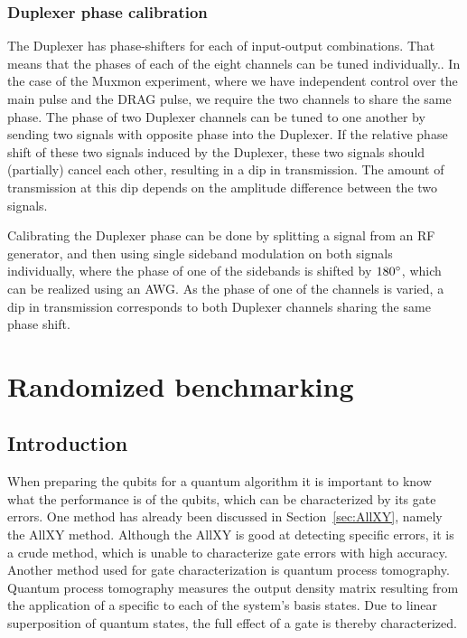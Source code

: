       \subsection{Duplexer phase calibration}
        \label{ssec:Duplexer phase calibration}
        The Duplexer has phase-shifters for each of input-output combinations. That means that the phases of each of the eight channels can be tuned individually.. In the case of the Muxmon experiment, where we have independent control over the main pulse and the DRAG pulse, we require the two channels to share the same phase. The phase of two Duplexer channels can be tuned to one another by sending two signals with opposite phase into the Duplexer. If the relative phase shift of these two signals induced by the Duplexer, these two signals should (partially) cancel each other, resulting in a dip in transmission. The amount of transmission at this dip depends on the amplitude difference between the two signals.

        Calibrating the Duplexer phase can be done by splitting a signal from an RF generator, and then using single sideband modulation on both signals individually, where the phase of one of the sidebands is shifted by $180 \degree$, which can be realized using an AWG. As the phase of one of the channels is varied, a dip in transmission corresponds to both Duplexer channels sharing the same phase shift.


  \chapter{Randomized benchmarking}
    \label{ch:randomized benchmarking}

    \section{Introduction}
      \label{sec:RB introduction}
      When preparing the qubits for a quantum algorithm it is important to know what the performance is of the qubits, which can be characterized by its gate errors. One method has already been discussed in Section~\ref{sec:AllXY}, namely the AllXY method. Although the AllXY is good at detecting specific errors, it is a crude method, which is unable to characterize gate errors with high accuracy. Another method used for gate characterization is quantum process tomography. Quantum process tomography measures the output density matrix resulting from the application of a specific to each of the system's basis states. Due to linear superposition of quantum states, the full effect of a gate is thereby characterized.

